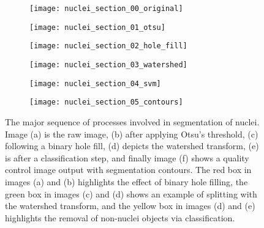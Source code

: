 \begin{figure}[htbp]\centering
	\begin{subfigure}[b]{0.25\linewidth} %
		\centering
		\texttt{[image: nuclei\_section\_00\_original]}
		\caption{}
		\label{figure:image_processing:nuclei_segmentation:00}
		\vspace{1ex}
	\end{subfigure}
	\begin{subfigure}[b]{0.25\linewidth} %
		\centering
		\texttt{[image: nuclei\_section\_01\_otsu]}
		\caption{}
		\label{figure:image_processing:nuclei_segmentation:01}
		\vspace{1ex}
	\end{subfigure}
	\begin{subfigure}[b]{0.25\linewidth} %
		\centering
		\texttt{[image: nuclei\_section\_02\_hole\_fill]}
		\caption{}
		\label{figure:image_processing:nuclei_segmentation:02}
		\vspace{1ex}
	\end{subfigure}
	\begin{subfigure}[b]{0.25\linewidth} %
		\centering
		\texttt{[image: nuclei\_section\_03\_watershed]}
		\caption{}
		\label{figure:image_processing:nuclei_segmentation:03}
		\vspace{1ex}
	\end{subfigure}
	\begin{subfigure}[b]{0.25\linewidth} %
		\centering
		\texttt{[image: nuclei\_section\_04\_svm]}
		\caption{}
		\label{figure:image_processing:nuclei_segmentation:04}
		\vspace{1ex}
	\end{subfigure}
	\begin{subfigure}[b]{0.25\linewidth} %
		\centering
		\texttt{[image: nuclei\_section\_05\_contours]}
		\caption{}
		\label{figure:image_processing:nuclei_segmentation:05}
		\vspace{1ex}
	\end{subfigure}
\caption[Nuclei segmentation]{The major sequence of processes involved in segmentation of nuclei. Image (a) is the raw image, (b) after applying Otsu's threshold, (c) following a binary hole fill, (d) depicts the watershed transform, (e) is after a classification step, and finally image (f) shows a quality control image output with segmentation contours. The red box in images (a) and (b) highlights the effect of binary hole filling, the green box in images (c) and (d) shows an example of splitting with the watershed transform, and the yellow box in images (d) and (e) highlights the removal of non-nuclei objects via classification.}
\label{figure:image_processing:nuclei_segmentation}
\end{figure}

